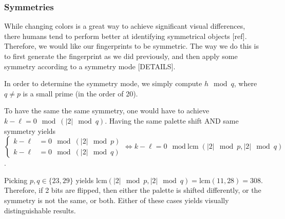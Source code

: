 \documentclass{article}
\begin{document}
\subsubsection{Symmetries}
While changing colors is a great way to achieve significant visual differences, there humans tend to perform better at identifying symmetrical objects [ref]. Therefore, we would like our fingerprints to be symmetric. The way we do this is to first generate the fingerprint as we did previously, and then apply some symmetry according to a symmetry mode [DETAILS].

In order to determine the symmetry mode, we simply compute $h \mod q$, where $q \neq p$ is a small prime (in the order of 20). 

To have the same the same symmetry, one would have to achieve $k - \ell = 0\mod (|2| \mod q)$. Having the same palette shift AND same symmetry yields
$$\begin{cases}
k - \ell &= 0 \mod (|2| \mod p)\\
k - \ell &= 0 \mod (|2| \mod q)
\end{cases} \iff k - \ell = 0 \mod \text{lcm}(|2| \mod p, |2| \mod q)$$.

Picking $p, q \in \{23, 29\}$ yields $\text{lcm}(|2| \mod p, |2| \mod q) = \text{lcm}(11, 28) = 308$. Therefore, if 2 bits are flipped, then either the palette is shifted differently, or the symmetry is not the same, or both. Either of these cases yields visually distinguishable results.
\end{document}
